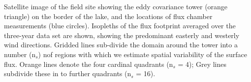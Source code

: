 \label{fig:fp_on_map_Stordalen} Satellite image of the field
site showing the eddy covariance tower (orange triangle) on the border
of the lake, and the locations of flux chamber measurements (blue
circles). Isopleths of the flux footprint averaged over the three-year
data set are shown, showing the predominant easterly and westerly wind
directions. Gridded lines sub-divide the domain around the tower into a
number (n\(_s\)) nof regions with which we estimate spatial variability of
the surface flux. Orange lines denote the four cardinal quadrants
(n\(_s\) = 4); Grey lines subdivide these in to further quadrants
(n\(_s\) = 16).